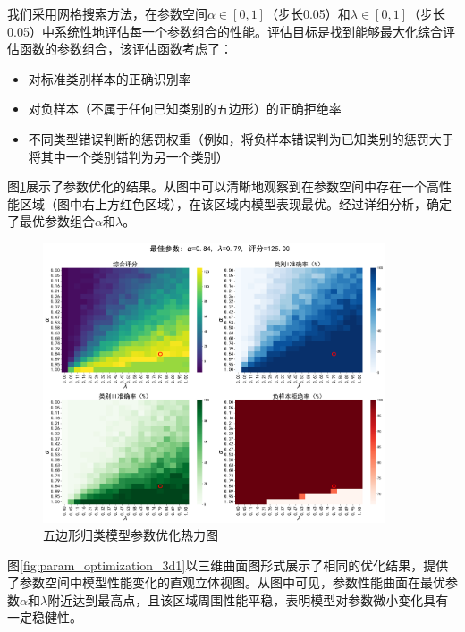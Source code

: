 我们采用网格搜索方法，在参数空间$\alpha \in [0, 1]$（步长0.05）和$\lambda \in [0, 1]$（步长0.05）中系统性地评估每一个参数组合的性能。评估目标是找到能够最大化综合评估函数的参数组合，该评估函数考虑了：

\begin{itemize}
    \item 对标准类别样本的正确识别率
    \item 对负样本（不属于任何已知类别的五边形）的正确拒绝率
    \item 不同类型错误判断的惩罚权重（例如，将负样本错误判为已知类别的惩罚大于将其中一个类别错判为另一个类别）
\end{itemize}

图\ref{fig:pentagon_params_heatmap}展示了参数优化的结果。从图中可以清晰地观察到在参数空间中存在一个高性能区域（图中右上方红色区域），在该区域内模型表现最优。经过详细分析，确定了最优参数组合$\alpha$和$\lambda$。

\begin{figure}[H]
    \centering
    \includegraphics[width=0.9\textwidth]{../figures/params/pentagon_parameter_optimization_heatmaps.png}
    \caption{五边形归类模型参数优化热力图}
    \label{fig:pentagon_params_heatmap}
\end{figure}

图\ref{fig:param_optimization_3d1}以三维曲面图形式展示了相同的优化结果，提供了参数空间中模型性能变化的直观立体视图。从图中可见，参数性能曲面在最优参数$\alpha$和$\lambda$附近达到最高点，且该区域周围性能平稳，表明模型对参数微小变化具有一定稳健性。

